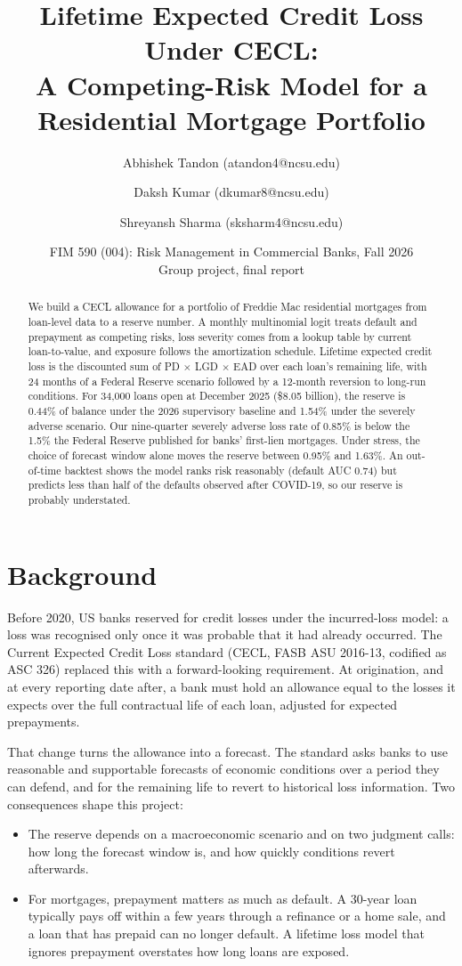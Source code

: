 \documentclass[11pt]{article}
\title{Lifetime Expected Credit Loss Under CECL:\\
A Competing-Risk Model for a Residential Mortgage Portfolio}
\author{Abhishek Tandon (atandon4@ncsu.edu) \and Daksh Kumar (dkumar8@ncsu.edu) \and Shreyansh Sharma (sksharm4@ncsu.edu)}
\date{FIM 590 (004): Risk Management in Commercial Banks, Fall 2026\\
Group project, final report}
\begin{document}
\maketitle

\begin{abstract}
\noindent
We build a CECL allowance for a portfolio of Freddie Mac residential mortgages from loan-level data to a
reserve number. A monthly multinomial logit treats default and prepayment as competing risks, loss severity
comes from a lookup table by current loan-to-value, and exposure follows the amortization schedule.
Lifetime expected credit loss is the discounted sum of PD $\times$ LGD $\times$ EAD over each loan's remaining
life, with 24 months of a Federal Reserve scenario followed by a 12-month reversion to long-run conditions.
For 34,000 loans open at December 2025 (\$8.05 billion), the reserve is 0.44\% of balance under the 2026
supervisory baseline and 1.54\% under the severely adverse scenario. Our nine-quarter severely adverse loss
rate of 0.85\% is below the 1.5\% the Federal Reserve published for banks' first-lien mortgages. Under stress,
the choice of forecast window alone moves the reserve between 0.95\% and 1.63\%. An out-of-time backtest shows
the model ranks risk reasonably (default AUC 0.74) but predicts less than half of the defaults observed after
COVID-19, so our reserve is probably understated.
\end{abstract}

\section{Background}

Before 2020, US banks reserved for credit losses under the incurred-loss model: a loss was recognised only once
it was probable that it had already occurred. The Current Expected Credit Loss standard (CECL, FASB ASU 2016-13,
codified as ASC 326) replaced this with a forward-looking requirement. At origination, and at every reporting
date after, a bank must hold an allowance equal to the losses it expects over the full contractual life of each
loan, adjusted for expected prepayments.

That change turns the allowance into a forecast. The standard asks banks to use reasonable and supportable
forecasts of economic conditions over a period they can defend, and for the remaining life to revert to
historical loss information. Two consequences shape this project:
\begin{itemize}
  \item The reserve depends on a macroeconomic scenario and on two judgment calls: how long the forecast window
        is, and how quickly conditions revert afterwards.
  \item For mortgages, prepayment matters as much as default. A 30-year loan typically pays off within a few years
        through a refinance or a home sale, and a loan that has prepaid can no longer default. A lifetime loss model
        that ignores prepayment overstates how long loans are exposed.
\end{itemize}
\end{document}
